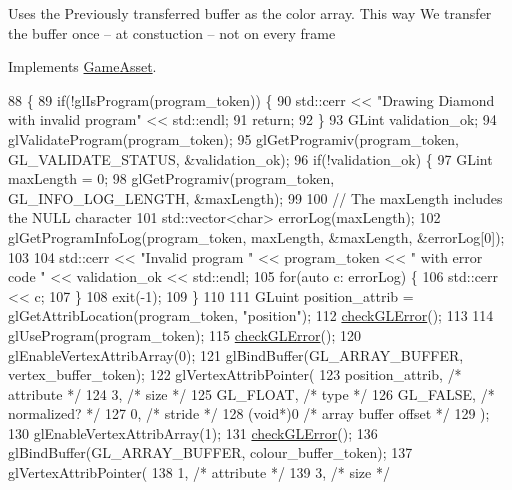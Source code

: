 Uses the Previously transferred buffer as the color array. This way We transfer the buffer once -- at constuction -- not on every frame

Implements \hyperlink{classGameAsset_a961aa51ca0a9961fc584c0b5d5431300}{Game\+Asset}.


\begin{DoxyCode}
88                                             \{
89   \textcolor{keywordflow}{if}(!glIsProgram(program\_token)) \{
90     std::cerr << \textcolor{stringliteral}{"Drawing Diamond with invalid program"} << std::endl;
91     \textcolor{keywordflow}{return};
92   \}
93   GLint validation\_ok;
94   glValidateProgram(program\_token);
95   glGetProgramiv(program\_token, GL\_VALIDATE\_STATUS, &validation\_ok);
96   \textcolor{keywordflow}{if}(!validation\_ok) \{
97     GLint maxLength = 0;
98     glGetProgramiv(program\_token, GL\_INFO\_LOG\_LENGTH, &maxLength);
99 
100     \textcolor{comment}{// The maxLength includes the NULL character}
101     std::vector<char> errorLog(maxLength);
102     glGetProgramInfoLog(program\_token, maxLength, &maxLength, &errorLog[0]);
103 
104     std::cerr << \textcolor{stringliteral}{"Invalid program "} << program\_token << \textcolor{stringliteral}{" with error code "} << validation\_ok << std::endl;
105     \textcolor{keywordflow}{for}(\textcolor{keyword}{auto} c: errorLog) \{
106       std::cerr << c;
107     \}
108     exit(-1);
109   \}
110 
111   GLuint position\_attrib = glGetAttribLocation(program\_token, \textcolor{stringliteral}{"position"});
112   \hyperlink{DiamondAsset_8cc_a75f201b0e53e68726854997957322b8d}{checkGLError}();
113 
114   glUseProgram(program\_token);
115   \hyperlink{DiamondAsset_8cc_a75f201b0e53e68726854997957322b8d}{checkGLError}();
120   glEnableVertexAttribArray(0);
121   glBindBuffer(GL\_ARRAY\_BUFFER, vertex\_buffer\_token);
122   glVertexAttribPointer(
123     position\_attrib,        \textcolor{comment}{/* attribute */}
124     3,        \textcolor{comment}{/* size */}
125     GL\_FLOAT,   \textcolor{comment}{/* type */}
126     GL\_FALSE,   \textcolor{comment}{/* normalized? */}
127     0,        \textcolor{comment}{/* stride */}
128     (\textcolor{keywordtype}{void}*)0    \textcolor{comment}{/* array buffer offset */}
129   );
130   glEnableVertexAttribArray(1);
131   \hyperlink{DiamondAsset_8cc_a75f201b0e53e68726854997957322b8d}{checkGLError}();
136   glBindBuffer(GL\_ARRAY\_BUFFER, colour\_buffer\_token);
137   glVertexAttribPointer(
138     1,        \textcolor{comment}{/* attribute */}
139     3,        \textcolor{comment}{/* size */}

\end{DoxyCode}
